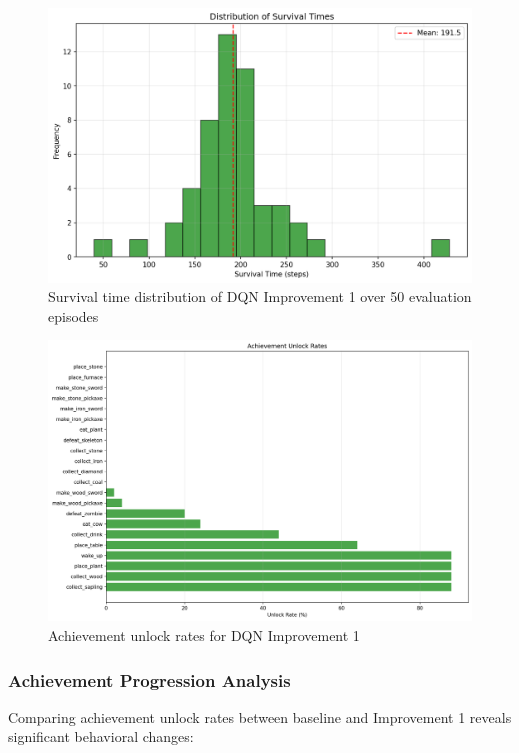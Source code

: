 \documentclass[twocolumn]{article}
\begin{document}
\begin{figure}[H]
    \centering
    \includegraphics[width=0.8\linewidth]{images/DQNImporv1survival_distribution.png}
    \caption{Survival time distribution of DQN Improvement 1 over 50 evaluation episodes}
    \label{fig:dqn_improv1_survival}
\end{figure}

\begin{figure}[H]
    \centering
    \includegraphics[width=0.8\linewidth]{images/DQNimprov1achievement_rates.png}
    \caption{Achievement unlock rates for DQN Improvement 1}
    \label{fig:dqn_improv1_achievements}
\end{figure}

\subsubsection*{Achievement Progression Analysis}

Comparing achievement unlock rates between baseline and Improvement 1 reveals significant behavioral changes:
\end{document}
